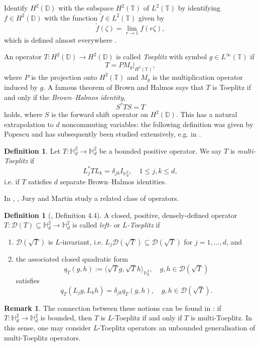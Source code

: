 \documentclass[11pt,reqno]{amsart}
\def\d{\delta}
\def\z{\zeta}
\def\DD{\mathbb{D}}
\def\TT{\mathbb{T}}
\def\HH{\mathbb{H}}
\def\cD{\mathcal{D}}
\theoremstyle{definition}
\newtheorem{definition}[theorem]{Definition}
\newtheorem{remark}[theorem]{Remark}
\numberwithin{equation}{section}
\renewcommand{\tilde}{\widetilde}
\begin{document}
Identify \(H^2(\DD)\) with the subspace \(H^2(\TT)\) of \(L^2(\TT)\) by identifying \(f \in H^2(\DD)\) with the function \(\tilde{f} \in L^2(\TT)\) given by
\[
    \tilde{f}(\z) = \lim_{r \to 1} f(r\z),
\]
which is defined almost everywhere \cite[Theorem 3.3.8]{Kat04}.

An operator \(T : H^2(\DD) \to H^2(\DD)\) is called \emph{Toeplitz} with symbol \(g \in L^{\infty}(\TT)\) if
\[
    T = PM_g \vert_{H^2(\TT)},
\]
where \(P\) is the projection onto \(H^2(\TT)\) and \(M_g\) is the multiplication operator induced by \(g\). A famous theorem of Brown and Halmos \cite[Theorem 6]{BH64} says that \(T\) is Toeplitz if and only if the \emph{Brown--Halmos identity},
\[
    S^* T S = T
\]
holds, where \(S\) is the forward shift operator on \(H^2(\DD)\). This has a natural extrapolation to \(d\) noncommuting variables: the following definition was given by Popescu and has subsequently been studied extensively, e.g. in \cite{Pop06}.

\begin{definition}
    \label{def:multiToeplitzOperator}
    Let \(T : \HH^2_d \to \HH^2_d\) be a bounded positive operator. We say \(T\) is \emph{multi-Toeplitz} if
    \[
        L_j^* T L_k = \d_{jk} I_{\HH^2_d}, \quad 1 \leq j,k \leq d,
    \]
    i.e. if \(T\) satisfies \(d\) separate Brown--Halmos identities.
\end{definition}

In \cite{JM22a}, \cite{JM22b}, Jury and Martin study a related class of operators.

\begin{definition}[\cite{JM22b}, Definition 4.4]
    \label{def:leftToeplitzOperator}
    A closed, positive, densely-defined operator \(T: \cD(T) \subseteq \HH^2_d \to \HH^2_d\) is called \emph{left-} or \emph{\(L\)-Toeplitz} if
    \begin{enumerate}
        \item \(\cD(\sqrt{T})\) is \(L\)-invariant, i.e. \(L_j \cD(\sqrt{T}) \subseteq \cD(\sqrt{T})\) for \(j = 1, \ldots, d\), and
        \item the associated closed quadratic form
        \[
            q_T(g,h) := \langle \sqrt{T} g, \sqrt{T} h \rangle_{\HH^2_d}, \quad g,h\in \cD(\sqrt{T})
        \]
        satisfies
        \[
            q_T(L_j g, L_k h) = \d_{jk} q_T(g,h), \quad g,h \in \cD(\sqrt{T}).
        \]
    \end{enumerate}
\end{definition}

\begin{remark}
    The connection between these notions can be found in \cite[Remark 6]{JM22a}: if \(T : \HH^2_d \to \HH^2_d\) is bounded, then \(T\) is \(L\)-Toeplitz if and only if \(T\) is multi-Toeplitz. In this sense, one may consider \(L\)-Toeplitz operators an unbounded generalisation of multi-Toeplitz operators.
\end{remark}
\end{document}
